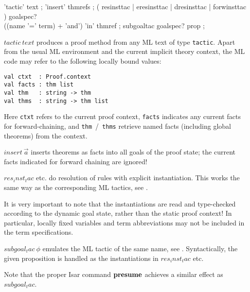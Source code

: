 




\begin{rail}
  'tactic' text
  ;
  'insert' thmrefs
  ;
  ( resinsttac | eresinsttac | dresinsttac | forwinsttac ) goalspec? \\
    ((name '=' term) + 'and') 'in' thmref
  ;
  subgoaltac goalspec? prop
  ;
\end{rail}

\begin{descr}
\item [$tactic~text$] produces a proof method from any ML text of type
  \texttt{tactic}.  Apart from the usual ML environment and the current
  implicit theory context, the ML code may refer to the following locally
  bound values:

{\footnotesize\begin{verbatim}
val ctxt  : Proof.context
val facts : thm list
val thm   : string -> thm
val thms  : string -> thm list
\end{verbatim}}
  Here \texttt{ctxt} refers to the current proof context, \texttt{facts}
  indicates any current facts for forward-chaining, and
  \texttt{thm}~/~\texttt{thms} retrieve named facts (including global
  theorems) from the context.
\item [$insert~\vec a$] inserts theorems as facts into all goals of the proof
  state; the current facts indicated for forward chaining are ignored!
\item [$res_inst_tac$ etc.] do resolution of rules with explicit
  instantiation.  This works the same way as the corresponding ML tactics, see
  \cite[\S3]{isabelle-ref}.
  
  It is very important to note that the instantiations are read and
  type-checked according to the dynamic goal state, rather than the static
  proof context!  In particular, locally fixed variables and term
  abbreviations may not be included in the term specifications.
\item [$subgoal_tac~\phi$] emulates the ML tactic of the same name, see
  \cite[\S3]{isabelle-ref}.  Syntactically, the given proposition is handled
  as the instantiations in $res_inst_tac$ etc.
  
  Note that the proper Isar command ${\mathord{\mathbf{presume}}}$ achieves a similar effect
  as $subgoal_tac$.
\end{descr}


